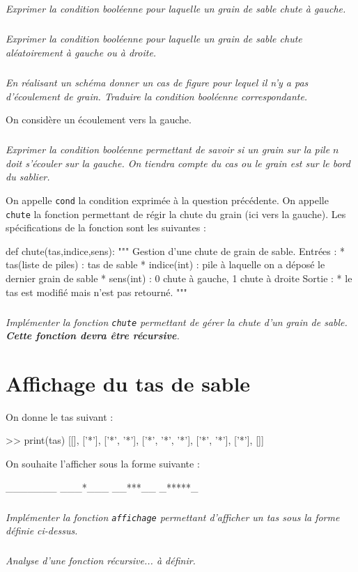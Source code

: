 \documentclass[10pt,fleqn]{article} %
\begin{document}
\subparagraph{}
\textit{Exprimer la condition booléenne pour laquelle un grain de sable chute à gauche.}

\subparagraph{}
\textit{Exprimer la condition booléenne pour laquelle un grain de sable chute aléatoirement à gauche ou à droite.}

\subparagraph{}
\textit{En réalisant un schéma donner un cas de figure pour lequel il n'y a pas d'écoulement de grain. Traduire la condition booléenne correspondante.}

On considère un écoulement vers la gauche. 

\subparagraph{}
\textit{Exprimer la condition booléenne permettant de savoir si un grain sur la pile $n$ doit s'écouler sur la gauche. On tiendra compte du cas ou le grain est sur le bord du sablier. }

\vspace{.25cm}

On appelle \texttt{cond} la condition exprimée à la question précédente.
On appelle \texttt{chute} la fonction permettant de régir la chute du grain (ici vers la gauche). Les spécifications de la fonction sont les suivantes : 
\begin{py}
\begin{python}
def chute(tas,indice,sens):
    """
    Gestion d'une chute de grain de sable.
    Entrées : 
     * tas(liste de piles) : tas de sable
     * indice(int) : pile à laquelle on a déposé le dernier grain de sable
     * sens(int) : 0 chute à gauche, 1 chute à droite
    Sortie : 
     * le tas est modifié mais n'est pas retourné.
    """
\end{python}
\end{py}

\subparagraph{}
\textit{Implémenter la fonction \texttt{chute} permettant de gérer la chute d'un grain de sable. \textbf{Cette fonction devra être récursive}.}

\section{Affichage du tas de sable}
\begin{minipage}[t]{.47\linewidth}
On donne le tas suivant : 
\begin{py}
\begin{python}
>> print(tas)
    [[], ['*'], ['*', '*'], ['*', '*', '*'], ['*', '*'], ['*'], []]
\end{python}
\end{py}
\end{minipage} \hfill
\begin{minipage}[t]{.47\linewidth}
On souhaite l'afficher sous la forme suivante : 
\begin{py}
\begin{python}
_______
___*___
__***__
_*****_
\end{python}
\end{py}
\end{minipage} 

\subparagraph{}
\textit{Implémenter la fonction \texttt{affichage} permettant d'afficher un tas sous la forme définie ci-dessus.}


\subparagraph{}
\textit{Analyse d'une fonction récursive... à définir.}
\end{document}
